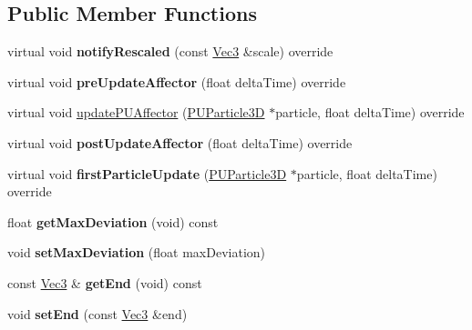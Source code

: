 \subsection*{Public Member Functions}
\begin{DoxyCompactItemize}
\item 
\mbox{\label{classPULineAffector_a7d6529fbfcecfd68db6b3a2281ec087b}} 
virtual void {\bfseries notify\+Rescaled} (const \hyperlink{classVec3}{Vec3} \&scale) override
\item 
\mbox{\label{classPULineAffector_aa376c00f5a078895fd7d84da13505850}} 
virtual void {\bfseries pre\+Update\+Affector} (float delta\+Time) override
\item 
virtual void \hyperlink{classPULineAffector_a4fafe8b1cc627879c13d4b098f14635b}{update\+P\+U\+Affector} (\hyperlink{structPUParticle3D}{P\+U\+Particle3D} $\ast$particle, float delta\+Time) override
\item 
\mbox{\label{classPULineAffector_a89347b8a820440640a39e28f5b418fb5}} 
virtual void {\bfseries post\+Update\+Affector} (float delta\+Time) override
\item 
\mbox{\label{classPULineAffector_ac96b32d1ac1ef2fb76643dab8b570c9d}} 
virtual void {\bfseries first\+Particle\+Update} (\hyperlink{structPUParticle3D}{P\+U\+Particle3D} $\ast$particle, float delta\+Time) override
\item 
\mbox{\label{classPULineAffector_ad561a55b8e524f169c1674f24b0620cc}} 
float {\bfseries get\+Max\+Deviation} (void) const
\item 
\mbox{\label{classPULineAffector_aa6932c0c23fc4028c1028fc3f2ade169}} 
void {\bfseries set\+Max\+Deviation} (float max\+Deviation)
\item 
\mbox{\label{classPULineAffector_a63145d3479b283ed1af05c18739519a4}} 
const \hyperlink{classVec3}{Vec3} \& {\bfseries get\+End} (void) const
\item 
\mbox{\label{classPULineAffector_a0b9231d2fb7d3cf8cbeb13f29a4e0d1f}} 
void {\bfseries set\+End} (const \hyperlink{classVec3}{Vec3} \&end)

\end{DoxyCompactItemize}
